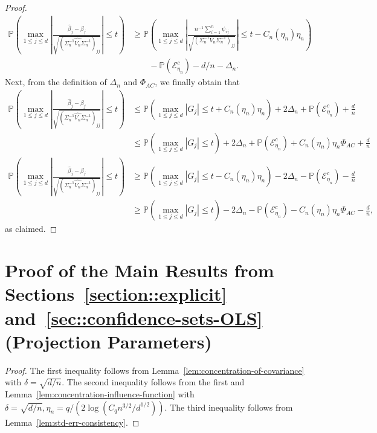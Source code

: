 \documentclass{article}
\begin{document}
\begin{appendices}
\begin{proof}
\begin{align*}
 \mathbb{P}\left(\max_{1\le j\le d}\left|\frac{\widehat{\beta}_j - \beta_j}{\sqrt{(\widehat{\Sigma_n^{-1}V_n\Sigma_n^{-1}})_{jj}}}\right| \le t\right) &\ge \mathbb{P}\left(\max_{1\le j\le d}\left|\frac{n^{-1}\sum_{i=1}^n \psi_{ij}}{\sqrt{(\Sigma_n^{-1}V_n\Sigma_n^{-1})_{jj}}}\right| \le t - C_n(\eta_n)\eta_n\right)\\ &\qquad- \mathbb{P}(\mathcal{E}_{\eta_n}^c) - d/n - \Delta_n.
 \end{align*}
 Next, from the definition of $\Delta_n$ and $\Phi_{AC}$, we finally obtain that
 \begin{align*}
 \mathbb{P}\left(\max_{1\le j\le d}\left|\frac{\widehat{\beta}_j - \beta_j}{\sqrt{(\widehat{\Sigma_n^{-1}V_n\Sigma_n^{-1}})_{jj}}}\right| \le t\right) &\le \mathbb{P}\left(\max_{1\le j\le d}|G_j| \le t + C_n(\eta_n)\eta_n\right) + 2\Delta_n + \mathbb{P}(\mathcal{E}_{\eta_n}^c) + \frac{d}{n}\\
 &\le \mathbb{P}\left(\max_{1\le j\le d}|G_j| \le t\right) + 2\Delta_n + \mathbb{P}(\mathcal{E}_{\eta_n}^c) + C_n(\eta_n)\eta_n \Phi_{AC} + \frac{d}{n}\\
 \mathbb{P}\left(\max_{1\le j\le d}\left|\frac{\widehat{\beta}_j - \beta_j}{\sqrt{(\widehat{\Sigma_n^{-1}V_n\Sigma_n^{-1}})_{jj}}}\right| \le t\right) &\ge \mathbb{P}\left(\max_{1\le j\le d}|G_j| \le t - C_n(\eta_n)\eta_n\right) - 2\Delta_n - \mathbb{P}(\mathcal{E}_{\eta_n}^c) - \frac{d}{n}\\
 &\ge \mathbb{P}\left(\max_{1\le j\le d}|G_j| \le t\right) - 2\Delta_n - \mathbb{P}(\mathcal{E}_{\eta_n}^c) - C_n(\eta_n)\eta_n \Phi_{AC} - \frac{d}{n},
 \end{align*}
 as claimed.
 \end{proof}
 
 
 
 \section{Proof of the Main Results from Sections~\ref{section::explicit} and~\ref{sec::confidence-sets-OLS} (Projection Parameters)}
 \label{appendix:main.ols}
 
 \begin{proof}
 The first inequality follows from Lemma~\ref{lem:concentration-of-covariance} with $\delta = \sqrt{d/n}$. The second inequality follows from the first and Lemma~\ref{lem:concentration-influence-function} with $\delta = \sqrt{d/n}, \eta_n = q/(2\log(C_qn^{3/2}/d^{1/2}))$. The third inequality follows from Lemma~\ref{lem:std-err-consistency}.
 \end{proof}
 

\end{appendices}
\end{document}
